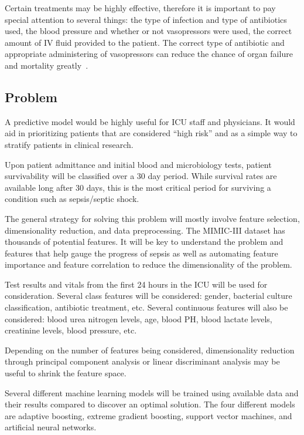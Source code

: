 \documentclass[11pt]{article}
\begin{document}
	Certain treatments may be highly effective, therefore it is important to pay special attention to several things: the type of infection and type of antibiotics used, the blood pressure and whether or not vasopressors were used, the correct amount of IV fluid provided to the patient. The correct type of antibiotic and appropriate administering of vasopressors can reduce the chance of organ failure and mortality greatly~\cite{pressors}.
	
	
	\subsection{Problem}
	
    A predictive model would be highly useful for ICU staff and physicians. It would aid in prioritizing patients that are considered ``high risk'' and as a simple way to stratify patients in clinical research. 

	Upon patient admittance and initial blood and microbiology tests, patient survivability will be classified over a 30 day period. While survival rates are available long after 30 days, this is the most critical period for surviving a condition such as sepsis/septic shock. 
	
	The general strategy for solving this problem will mostly involve feature selection, dimensionality reduction, and data preprocessing. The MIMIC-III dataset has thousands of potential features. It will be key to understand the problem and features that help gauge the progress of sepsis as well as automating feature importance and feature correlation to reduce the dimensionality of the problem.
	
	Test results and vitals from the first 24 hours in the ICU will be used for consideration. Several class features will be considered: gender, bacterial culture classification, antibiotic treatment, etc. Several continuous features will also be considered: blood urea nitrogen levels, age, blood PH, blood lactate levels, creatinine levels, blood pressure, etc.
	
	Depending on the number of features being considered, dimensionality reduction through principal component analysis or linear discriminant analysis may be useful to shrink the feature space. 
	
	Several different machine learning models will be trained using available data and their results compared to discover an optimal solution. The four different models are adaptive boosting, extreme gradient boosting, support vector machines, and artificial neural networks. 
	
\end{document}

